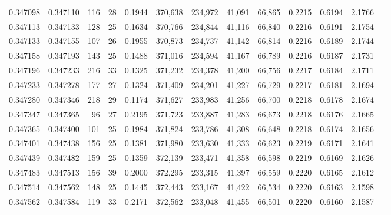 \begin{tabular}{rrrrrrrrrrrrr}
0.347098 & 0.347110 &   116 &  28 &                                     0.1944 & 370,638 & 234,972 &  41,091 &  66,865 & 0.2215 & 0.6194 & 2.1766 \\
0.347113 & 0.347133 &   128 &  25 &                                     0.1634 & 370,766 & 234,844 &  41,116 &  66,840 & 0.2216 & 0.6191 & 2.1754 \\
0.347133 & 0.347155 &   107 &  26 &                                     0.1955 & 370,873 & 234,737 &  41,142 &  66,814 & 0.2216 & 0.6189 & 2.1744 \\
0.347158 & 0.347193 &   143 &  25 &                                     0.1488 & 371,016 & 234,594 &  41,167 &  66,789 & 0.2216 & 0.6187 & 2.1731 \\
0.347196 & 0.347233 &   216 &  33 &                                     0.1325 & 371,232 & 234,378 &  41,200 &  66,756 & 0.2217 & 0.6184 & 2.1711 \\
0.347233 & 0.347278 &   177 &  27 &                                     0.1324 & 371,409 & 234,201 &  41,227 &  66,729 & 0.2217 & 0.6181 & 2.1694 \\
0.347280 & 0.347346 &   218 &  29 &                                     0.1174 & 371,627 & 233,983 &  41,256 &  66,700 & 0.2218 & 0.6178 & 2.1674 \\
0.347347 & 0.347365 &    96 &  27 &                                     0.2195 & 371,723 & 233,887 &  41,283 &  66,673 & 0.2218 & 0.6176 & 2.1665 \\
0.347365 & 0.347400 &   101 &  25 &                                     0.1984 & 371,824 & 233,786 &  41,308 &  66,648 & 0.2218 & 0.6174 & 2.1656 \\
0.347401 & 0.347438 &   156 &  25 &                                     0.1381 & 371,980 & 233,630 &  41,333 &  66,623 & 0.2219 & 0.6171 & 2.1641 \\
0.347439 & 0.347482 &   159 &  25 &                                     0.1359 & 372,139 & 233,471 &  41,358 &  66,598 & 0.2219 & 0.6169 & 2.1626 \\
0.347483 & 0.347513 &   156 &  39 &                                     0.2000 & 372,295 & 233,315 &  41,397 &  66,559 & 0.2220 & 0.6165 & 2.1612 \\
0.347514 & 0.347562 &   148 &  25 &                                     0.1445 & 372,443 & 233,167 &  41,422 &  66,534 & 0.2220 & 0.6163 & 2.1598 \\
0.347562 & 0.347584 &   119 &  33 &                                     0.2171 & 372,562 & 233,048 &  41,455 &  66,501 & 0.2220 & 0.6160 & 2.1587 \\

\end{tabular}
